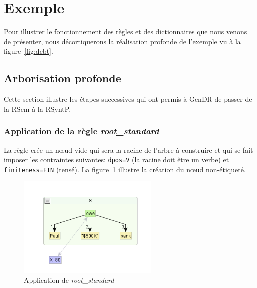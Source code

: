 
\section{Exemple}\label{sec:exemple}

Pour illustrer le fonctionnement des règles et des dictionnaires que nous venons de présenter, nous décortiquerons la réalisation profonde de l'exemple vu à la figure~\ref{fig:debt}.

\subsection{Arborisation profonde}

Cette section illustre les étapes successives qui ont permis à GenDR de passer de la \ac{RSem} à la \ac{RSyntP}.

\subsubsection{Application de la règle \emph{root\_standard}}
La règle crée un n\oe{}ud vide qui sera la racine de l'arbre à construire et qui se fait imposer les contraintes suivantes: \texttt{dpos=V} (la racine doit être un verbe) et \texttt{finiteness=FIN} (tensé). La figure~\ref{fig:rootstand} illustre la création du n\oe{}ud non-étiqueté.
\begin{figure}[htb]
	\centering
	\includegraphics[width=0.6\textwidth, trim = {1cm 0.5cm 0cm 1cm},clip]{ch3/figs/inspecteur_root.png}
	\vspace{-0.5cm}
	\caption{Application de \emph{root\_standard}}
	\label{fig:rootstand}
\end{figure}

